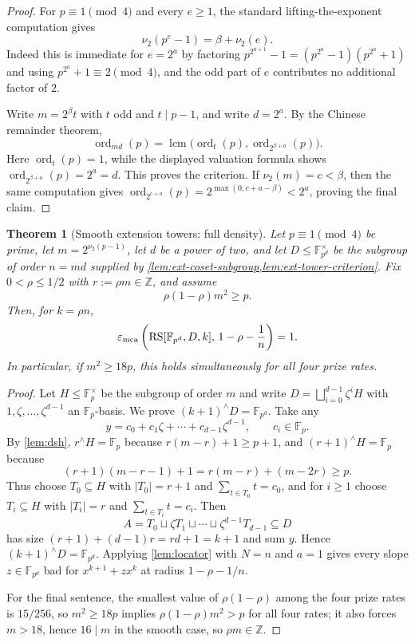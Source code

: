 \documentclass[11pt]{article}
\newtheorem{theorem}{Theorem}[section]
\theoremstyle{definition}
\newcommand{\F}{\mathbb F}
\newcommand{\Z}{\mathbb Z}
\newcommand{\RS}{\operatorname{RS}}
\newcommand{\eps}{\varepsilon}
\newcommand{\ord}{\operatorname{ord}}
\newcommand{\vtwo}{\nu_2}
\begin{document}
\begin{proof}
For $p\equiv1\pmod4$ and every $e\ge1$, the standard lifting-the-exponent computation gives
\[
        \vtwo(p^e-1)=\beta+\vtwo(e).
\]
Indeed this is immediate for $e=2^a$ by factoring $p^{2^{a+1}}-1=(p^{2^a}-1)(p^{2^a}+1)$ and using $p^{2^a}+1\equiv2\pmod4$, and the odd part of $e$ contributes no additional factor of $2$.

Write $m=2^\beta t$ with $t$ odd and $t\mid p-1$, and write $d=2^a$.  By the Chinese remainder theorem,
\[
        \ord_{md}(p)=\operatorname{lcm}\bigl(\ord_t(p),\ord_{2^{\beta+a}}(p)\bigr).
\]
Here $\ord_t(p)=1$, while the displayed valuation formula shows $\ord_{2^{\beta+a}}(p)=2^a=d$.  This proves the criterion.  If $\vtwo(m)=c<\beta$, then the same computation gives $\ord_{2^{c+a}}(p)=2^{\max(0,c+a-\beta)}<2^a$, proving the final claim.
\end{proof}

\begin{theorem}[Smooth extension towers: full density]\label{thm:ext-smooth-towers}
Let $p\equiv1\pmod4$ be prime, let $m=2^{\vtwo(p-1)}$, let $d$ be a power of two, and let $D\le\F_{p^d}^{\times}$ be the subgroup of order $n=md$ supplied by \cref{lem:ext-coset-subgroup,lem:ext-tower-criterion}.  Fix $0<\rho\le1/2$ with $r:=\rho m\in\Z$, and assume
\[
        \rho(1-\rho)m^2\ge p.
\]
Then, for $k=\rho n$,
\[
        \eps_{\rm mca}\left(\RS[\F_{p^d},D,k],\,1-\rho-\frac1n\right)=1.
\]
In particular, if $m^2\ge18p$, this holds simultaneously for all four prize rates.
\end{theorem}

\begin{proof}
Let $H\le\F_p^\times$ be the subgroup of order $m$ and write $D=\bigsqcup_{i=0}^{d-1}\zeta^iH$ with $1,\zeta,\ldots,\zeta^{d-1}$ an $\F_p$-basis.  We prove $(k+1)^{\wedge}D=\F_{p^d}$.  Take any
\[
        y=c_0+c_1\zeta+\cdots+c_{d-1}\zeta^{d-1},
        \qquad c_i\in\F_p.
\]
By \cref{lem:dsh}, $r^{\wedge}H=\F_p$ because $r(m-r)+1\ge p+1$, and $(r+1)^{\wedge}H=\F_p$ because
\[
        (r+1)(m-r-1)+1=r(m-r)+(m-2r)\ge p.
\]
Thus choose $T_0\subseteq H$ with $|T_0|=r+1$ and $\sum_{t\in T_0}t=c_0$, and for $i\ge1$ choose $T_i\subseteq H$ with $|T_i|=r$ and $\sum_{t\in T_i}t=c_i$.  Then
\[
        A=T_0\sqcup \zeta T_1\sqcup\cdots\sqcup \zeta^{d-1}T_{d-1}\subseteq D
\]
has size $(r+1)+(d-1)r=rd+1=k+1$ and sum $y$.  Hence $(k+1)^{\wedge}D=\F_{p^d}$.  Applying \cref{lem:locator} with $N=n$ and $a=1$ gives every slope $z\in\F_{p^d}$ bad for $x^{k+1}+zx^k$ at radius $1-\rho-1/n$.

For the final sentence, the smallest value of $\rho(1-\rho)$ among the four prize rates is $15/256$, so $m^2\ge18p$ implies $\rho(1-\rho)m^2>p$ for all four rates; it also forces $m>18$, hence $16\mid m$ in the smooth case, so $\rho m\in\Z$.
\end{proof}
\end{document}
